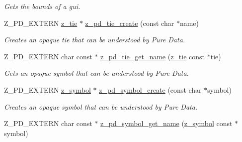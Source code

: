 \begin{DoxyCompactItemize}
\begin{DoxyCompactList}\small\item\em Gets the bounds of a gui. \end{DoxyCompactList}\item 
\hypertarget{group__zpd_ga3ab87f44cdf6ad7fcb900e826a9d0532}{Z\-\_\-\-P\-D\-\_\-\-E\-X\-T\-E\-R\-N \hyperlink{group__zpd_ga36a59f7502bf6b62bab3e65cc08fe08d}{z\-\_\-tie} $\ast$ \hyperlink{group__zpd_ga3ab87f44cdf6ad7fcb900e826a9d0532}{z\-\_\-pd\-\_\-tie\-\_\-create} (const char $\ast$name)}\label{group__zpd_ga3ab87f44cdf6ad7fcb900e826a9d0532}

\begin{DoxyCompactList}\small\item\em Creates an opaque tie that can be understood by Pure Data. \end{DoxyCompactList}\item 
\hypertarget{group__zpd_gabe03c4d72527f6ff32e752b54a39d081}{Z\-\_\-\-P\-D\-\_\-\-E\-X\-T\-E\-R\-N char const $\ast$ \hyperlink{group__zpd_gabe03c4d72527f6ff32e752b54a39d081}{z\-\_\-pd\-\_\-tie\-\_\-get\-\_\-name} (\hyperlink{group__zpd_ga36a59f7502bf6b62bab3e65cc08fe08d}{z\-\_\-tie} const $\ast$tie)}\label{group__zpd_gabe03c4d72527f6ff32e752b54a39d081}

\begin{DoxyCompactList}\small\item\em Gets an opaque symbol that can be understood by Pure Data. \end{DoxyCompactList}\item 
\hypertarget{group__zpd_gabd9d0741644cc35e92fb9e80336702d3}{Z\-\_\-\-P\-D\-\_\-\-E\-X\-T\-E\-R\-N \hyperlink{group__zpd_ga43e609e9bccc7a2018b8f16558b9494c}{z\-\_\-symbol} $\ast$ \hyperlink{group__zpd_gabd9d0741644cc35e92fb9e80336702d3}{z\-\_\-pd\-\_\-symbol\-\_\-create} (const char $\ast$symbol)}\label{group__zpd_gabd9d0741644cc35e92fb9e80336702d3}

\begin{DoxyCompactList}\small\item\em Creates an opaque symbol that can be understood by Pure Data. \end{DoxyCompactList}\item 
\hypertarget{group__zpd_ga8345ad2dc059629f43f9a86bbe8c4b6d}{Z\-\_\-\-P\-D\-\_\-\-E\-X\-T\-E\-R\-N char const $\ast$ \hyperlink{group__zpd_ga8345ad2dc059629f43f9a86bbe8c4b6d}{z\-\_\-pd\-\_\-symbol\-\_\-get\-\_\-name} (\hyperlink{group__zpd_ga43e609e9bccc7a2018b8f16558b9494c}{z\-\_\-symbol} const $\ast$symbol)}\label{group__zpd_ga8345ad2dc059629f43f9a86bbe8c4b6d}


\end{DoxyCompactItemize}
